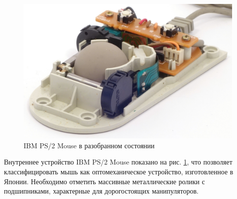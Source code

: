 \documentclass[11pt, a4paper]{article}
\begin{document}
\begin{figure}[h]
    \centering
    \includegraphics[scale=0.7]{1987_ibm_ps2_mouse/razob1.jpg} 
    \caption{IBM PS/2 Mouse в разобранном состоянии}
    \label{fig:IBMPS2Inside}
\end{figure}

Внутреннее устройство IBM PS/2 Mouse показано на рис. \ref{fig:IBMPS2Inside}, что позволяет классифицировать мышь как оптомеханическое устройство, изготовленное в Японии. Необходимо отметить массивные металлические ролики с подшипниками, характерные для дорогостоящих манипуляторов.
\end{document}
